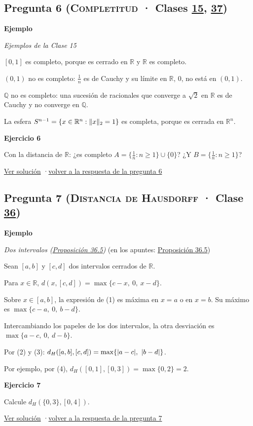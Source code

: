 \documentclass[11pt,a4paper]{article}
\newcommand{\R}{\mathbb{R}}\newcommand{\N}{\mathbb{N}}\newcommand{\Q}{\mathbb{Q}}
\newcommand{\bloque}[1]{\par\smallskip\noindent\textbf{\color{acento}#1}\par}
\begin{document}
\subsection*{\hypertarget{e-6}{}Pregunta 6 \normalfont\small(\textsc{Completitud} · Clases \href{https://decostruttivismo.github.io/MAT2514-repaso/pdf/MAT2514_apuntes_completos.pdf\#nameddest=section.15}{15}, \href{https://decostruttivismo.github.io/MAT2514-repaso/pdf/MAT2514_apuntes_completos.pdf\#nameddest=section.37}{37})}
\bloque{Ejemplo}
\textit{Ejemplos de la Clase 15}
\begin{pasos}
\item[] $[0,1]$ es completo, porque es cerrado en $\R$ y $\R$ es completo.
\item[] $(0,1)$ no es completo: $\frac1n$ es de Cauchy y su límite en $\R$, $0$, no está en $(0,1)$.
\item[] $\Q$ no es completo: una sucesión de racionales que converge a $\sqrt2$ en $\R$ es de Cauchy y no converge en $\Q$.
\item[] La esfera $S^{n-1}=\{x\in\R^n:\norm x_2=1\}$ es completa, porque es cerrada en $\R^n$.
\end{pasos}
\bloque{\hypertarget{x-6}{}Ejercicio 6}
Con la distancia de $\R$: ¿es completo $A=\{\frac1n:n\ge1\}\cup\{0\}$? ¿Y $B=\{\frac1n:n\ge1\}$?
\par{\small \hyperlink{s-6}{Ver solución} \quad·\quad \hyperlink{r-6}{volver a la respuesta de la pregunta 6}}
\subsection*{\hypertarget{e-7}{}Pregunta 7 \normalfont\small(\textsc{Distancia de Hausdorff} · Clase \href{https://decostruttivismo.github.io/MAT2514-repaso/pdf/MAT2514_apuntes_completos.pdf\#nameddest=section.36}{36})}
\bloque{Ejemplo}
\textit{Dos intervalos (\href{https://decostruttivismo.github.io/MAT2514-repaso/pdf/MAT2514_apuntes_completos.pdf\#nameddest=teorema.36.5}{Proposición 36.5})} {\small(en los apuntes: \href{https://decostruttivismo.github.io/MAT2514-repaso/pdf/MAT2514_apuntes_completos.pdf\#nameddest=teorema.36.5}{Proposición 36.5})}
\begin{pasos}
\item[] Sean $[a,b]$ y $[c,d]$ dos intervalos cerrados de $\R$.
\item[(1)] Para $x\in\R$, $d(x,[c,d])=\max\{c-x,\ 0,\ x-d\}$.
\item[(2)] Sobre $x\in[a,b]$, la expresión de (1) es máxima en $x=a$ o en $x=b$. Su máximo es $\max\{c-a,\ 0,\ b-d\}$.
\item[(3)] Intercambiando los papeles de los dos intervalos, la otra desviación es $\max\{a-c,\ 0,\ d-b\}$.
\item[(4)] Por (2) y (3): $d_H([a,b],[c,d])=\max\{\abs{a-c},\ \abs{b-d}\}$.
\item[] Por ejemplo, por (4), $d_H([0,1],[0,3])=\max\{0,2\}=2$.
\end{pasos}
\bloque{\hypertarget{x-7}{}Ejercicio 7}
Calcule $d_H(\{0,3\},[0,4])$.
\par{\small \hyperlink{s-7}{Ver solución} \quad·\quad \hyperlink{r-7}{volver a la respuesta de la pregunta 7}}
\end{document}
